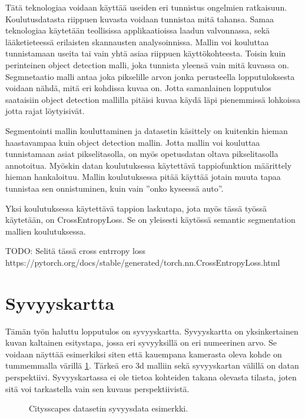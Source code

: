 Tätä teknologiaa voidaan käyttää useiden eri tunnistus ongelmien ratkaisuun.
Koulutusdatasta riippuen kuvasta voidaan tunnistaa mitä tahansa. Samaa teknologiaa käytetään teollisissa applikaatioissa laadun valvonnassa, sekä lääketieteessä erilaisten skannausten analysoinnissa.
Mallin voi kouluttaa tunnistamaan useita tai vain yhtä asiaa riippuen käyttökohteesta.
Toisin kuin perinteinen object detection malli, joka tunnista yleensä vain mitä kuvassa on. Segmnetaatio malli antaa joka pikselille arvon jonka perusteella lopputuloksesta voidaan nähdä, mitä eri kohdissa kuvaa on.
Jotta samanlainen lopputulos saataisiin object detection mallilla pitäisi kuvaa käydä läpi pienemmissä lohkoissa jotta rajat löytyisivät.

Segmentointi mallin kouluttaminen ja datasetin käsittely on kuitenkin hieman haastavampaa kuin object detection mallin. Jotta mallin voi kouluttaa tunnistamaan asiat pikselitasolla, on myös opetusdatan oltava pikselitasolla annotoitua. 
Myöskin datan koulutuksessa käytettävä tappiofunktion määrittely hieman hankaloituu.
Mallin koulutuksessa pitää käyttää jotain muuta tapaa tunnistaa sen onnistuminen, kuin vain ”onko kyseessä auto”.

Yksi koulutuksessa käytettävä tappion laskutapa, jota myös tässä työssä käytetään, on CrossEntropyLoss. Se on yleisesti käytössä semantic segmentation mallien koulutuksessa. 

TODO: Selitä tässä cross entrropy loss https://pytorch.org/docs/stable/generated/torch.nn.CrossEntropyLoss.html

\section{Syvyyskartta}

Tämän työn haluttu lopputulos on syvyyskartta.
Syvyyskartta on yksinkertainen kuvan kaltainen esitystapa, jossa eri syvyyksillä on eri numeerinen arvo.
Se voidaan näyttää esimerkiksi siten että kauempana kamerasta oleva kohde on tummemmalla värillä \ref{fig:depth}.
Tärkeä ero 3d malliin sekä syvyyskartan välillä on datan perspektiivi.
Syvyyskartassa ei ole tietoa kohteiden takana olevasta tilasta, joten sitä voi tarkastella vain sen kuvaus perspektiivistä.


\begin{figure}[h]
\centering
{}
\caption[Tämä on lyhyt kuvateksti.]{Citysscapes datasetin syvyysdata esimerkki.}
\label{fig:depth}
\end{figure}

